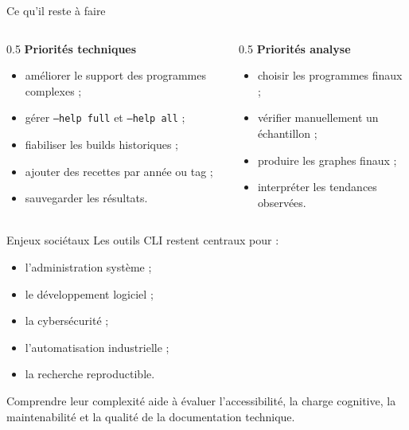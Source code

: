 \documentclass[10pt,aspectratio=169]{beamer}
\begin{document}
\begin{frame}{Ce qu'il reste à faire}
  \begin{columns}[T]
    \begin{column}{0.5\linewidth}
      \textbf{Priorités techniques}
      \begin{itemize}
        \item améliorer le support des programmes complexes ;
        \item gérer \texttt{--help full} et \texttt{--help all} ;
        \item fiabiliser les builds historiques ;
        \item ajouter des recettes par année ou tag ;
        \item sauvegarder les résultats.
      \end{itemize}
    \end{column}
    \begin{column}{0.5\linewidth}
      \textbf{Priorités analyse}
      \begin{itemize}
        \item choisir les programmes finaux ;
        \item vérifier manuellement un échantillon ;
        \item produire les graphes finaux ;
        \item interpréter les tendances observées.
      \end{itemize}
    \end{column}
  \end{columns}
\end{frame}

\begin{frame}{Enjeux sociétaux}
  Les outils CLI restent centraux pour :

  \begin{itemize}
    \item l'administration système ;
    \item le développement logiciel ;
    \item la cybersécurité ;
    \item l'automatisation industrielle ;
    \item la recherche reproductible.
  \end{itemize}

  \vspace{0.3cm}
  Comprendre leur complexité aide à évaluer l'accessibilité, la charge cognitive, la maintenabilité et la qualité de la documentation technique.
\end{frame}
\end{document}
